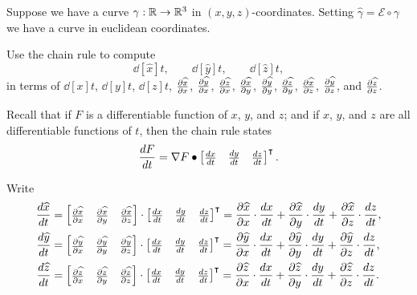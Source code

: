 \documentclass[newpage,hints,handout,12pt,noauthor,nooutcomes]{ximera}
\begin{document}
\begin{problem}
  Suppose we have a curve $\gamma:\R\to\R^3$ in
  $(x,y,z)$-coordinates. Setting $\hat \gamma = \mathcal{E}\circ\gamma$ we have
  a curve in euclidean coordinates. 
  \begin{center}
  \end{center}
  
  Use the chain rule to compute
  \[
  \dd[\hat x]{t}, \qquad \dd[\hat y]{t}, \qquad \dd[\hat z]{t},
  \]
  in terms of $\dd[x]{t}$, $\dd[y]{t}$, $\dd[z]{t}$, $\pp[\hat x]{x}$, $\pp[\hat y]{x}$, $\pp[\hat z]{x}$,
  $\pp[\hat x]{y}$, $\pp[\hat y]{y}$, $\pp[\hat z]{y}$, $\pp[\hat x]{z}$, $\pp[\hat y]{z}$, and $\pp[\hat z]{z}$. 
  \begin{hint}
    Recall that if $F$ is a differentiable function of $x$, $y$, and
    $z$; and if $x$, $y$, and $z$ are all differentiable functions of
    $t$, then the chain rule states
    \[
    \dd[F]{t} = \nabla F \dot
    \begin{bmatrix}
      \dd[x]{t} & \dd[y]{t} & \dd[z]{t}
    \end{bmatrix}^\transpose.
    \]
  \end{hint}
  \begin{freeResponse}
    Write
    \begin{align*}
      \dd[\hat x]{t} &= \begin{bmatrix} \pp[\hat x]{x} & \pp[\hat x]{y} & \pp[\hat x]{z} \end{bmatrix} \cdot \begin{bmatrix} \dd[x]{t} & \dd[y]{t} & \dd[z]{t} \end{bmatrix}^\transpose
      = \pp[\hat x]{x}\cdot\dd[x]{t} + \pp[\hat x]{y}\cdot\dd[y]{t} + \pp[\hat x]{z}\cdot\dd[z]{t}, \\
      \dd[\hat y]{t} &= \begin{bmatrix} \pp[\hat y]{x} & \pp[\hat y]{y} & \pp[\hat y]{z} \end{bmatrix} \cdot \begin{bmatrix} \dd[x]{t} & \dd[y]{t} & \dd[z]{t} \end{bmatrix}^\transpose
      = \pp[\hat y]{x}\cdot\dd[x]{t} + \pp[\hat y]{y}\cdot\dd[y]{t} + \pp[\hat y]{z}\cdot\dd[z]{t}, \\
      \dd[\hat z]{t} &= \begin{bmatrix} \pp[\hat z]{x} & \pp[\hat z]{y} & \pp[\hat z]{z} \end{bmatrix} \cdot \begin{bmatrix} \dd[x]{t} & \dd[y]{t} & \dd[z]{t} \end{bmatrix}^\transpose
      = \pp[\hat z]{x}\cdot\dd[x]{t} + \pp[\hat z]{y}\cdot\dd[y]{t} + \pp[\hat z]{z}\cdot\dd[z]{t}.
    \end{align*}
  \end{freeResponse}
\end{problem}
\end{document}
